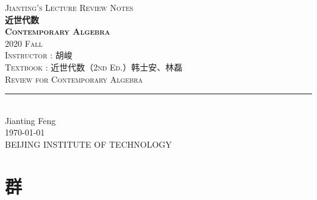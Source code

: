 \documentclass[11pt,titlepage]{report}
\begin{document}
\begin{titlepage}
	\centering
    \textsc{\LARGE Jianting's Lecture Review Notes}\\ \vspace{\fill}
    \textbf{\textsc{\fontsize{20}{20}\selectfont 近世代数\\ Contemporary Algebra}}\\ \vspace{\fill}
    \medskip
    \textsc{2020 Fall}\\
    \medskip
    \textsc{Instructor : 胡峻}\\
    \medskip
    \textsc{Textbook : 近世代数（2nd Ed.）韩士安、林磊}\\
    \bigskip
	\textsc{Review for Contemporary Algebra}\\[0.4cm]
	\rule{\linewidth}{0.2 mm} \\[0.5 cm]
	Jianting Feng\\
	\today\\
	BEIJING INSTITUTE OF TECHNOLOGY
\end{titlepage}
\restoregeometry

\newpage
\tableofcontents
\newpage
\thispagestyle{numberonly}


\chapter{群}




\clearpage
\pagestyle{numberonly}
\printbibliography
\end{document}
